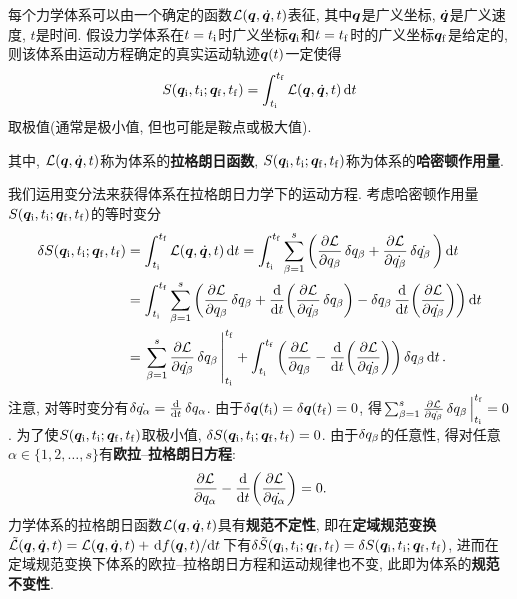 \begin{postulate}[最小作用量原理]\label{pos:最小作用量原理}
    每个力学体系可以由一个确定的函数$ \mathcal{L}(\vb*{q},\dot{\vb*{q}},t) $表征, 其中$ \vb*{q} $是广义坐标, $ \dot{\vb*{q}} $是广义速度, $ t $是时间. 假设力学体系在$ t=t_{\mathrm{i}} $时广义坐标$ \vb*{q}_{\mathrm{i}} $和$ t=t_{\mathrm{f}} $时的广义坐标$ \vb*{q}_{\mathrm{f}} $是给定的, 则该体系由运动方程确定的真实运动轨迹$ \vb*{q}(t) $一定使得
    \begin{equation}
        S(\vb*{q}_{\mathrm{i}},t_{\mathrm{i}};\vb*{q}_{\mathrm{f}},t_{\mathrm{f}})=\int_{t_{\mathrm{i}}}^{t_{\mathrm{f}}} \mathcal{L}(\vb*{q},\dot{\vb*{q}},t) \dd{t}
    \end{equation}
    取极值(通常是极小值, 但也可能是鞍点或极大值).
\end{postulate}
其中, $ \mathcal{L}(\vb*{q},\dot{\vb*{q}},t) $称为体系的\textbf{拉格朗日函数}, $ S(\vb*{q}_{\mathrm{i}},t_{\mathrm{i}};\vb*{q}_{\mathrm{f}},t_{\mathrm{f}}) $称为体系的\textbf{哈密顿作用量}.

我们运用变分法来获得体系在拉格朗日力学下的运动方程. 考虑哈密顿作用量$ S(\vb*{q}_{\mathrm{i}},t_{\mathrm{i}};\vb*{q}_{\mathrm{f}},t_{\mathrm{f}}) $的等时变分
\begin{align*}
    \var{\action(\vb*{q}_{\init},t_{\init};\vb*{q}_{\fini},t_{\fini})} &=\int_{t_{\init}}^{t_{\fini}} \lagr(\vb*{q},\dot{\vb*{q}},t) \dd{t} = \int_{t_{\init}}^{t_{\fini}} \sum_{\beta=1}^s\bigg(\pdv{\lagr}{q_{\beta}}\var{q_{\beta}}+\pdv{\lagr}{\dot{q_{\beta}}}\var{\dot{q_{\beta}}}\bigg) \dd{t}\\
    &=\int_{t_{\init}}^{t_{\fini}} \sum_{\beta=1}^s\bigg(\pdv{\lagr}{q_{\beta}}\var{q_{\beta}} + \dv{t}(\pdv{\lagr}{\dot{q_{\beta}}} \var{q_{\beta}}) - \var{q_{\beta}} \dv{t}(\pdv{\lagr}{\dot{q_{\beta}}})\bigg) \dd{t}\\
    &=\eval{\sum_{\beta=1}^s \pdv{\lagr}{\dot{q_{\beta}}}\var{q_{\beta}}}_{t_{\init}}^{t_{\fini}}+\int_{t_{\init}}^{t_{\fini}} \bigg(\pdv{\lagr}{q_{\beta}} - \dv{t}(\pdv{\lagr}{\dot{q_{\beta}}})\bigg) \var{q_{\beta}} \dd{t}.
\end{align*}
注意, 对等时变分有$ \var{\dot{q_{\alpha}}} = \dv{t} \var{q_{\alpha}} $. 由于$ \var{\vb*{q}(t_{\mathrm{i}})}=\var{\vb*{q}(t_{\mathrm{f}})}=0 $, 得$ \eval{\sum_{\beta=1}^s \pdv{\lagr}{\dot{q_{\beta}}}\var{q_{\beta}}}_{t_{\init}}^{t_{\fini}}=0 $. 为了使$ S(\vb*{q}_{\mathrm{i}},t_{\mathrm{i}};\vb*{q}_{\mathrm{f}},t_{\mathrm{f}}) $取极小值, $ \var{S(\vb*{q}_{\mathrm{i}},t_{\mathrm{i}};\vb*{q}_{\mathrm{f}},t_{\mathrm{f}})}=0 $. 由于$ \var{q_{\beta}} $的任意性, 得对任意$ \alpha \in \{1,2,\ldots,s\} $有\textbf{欧拉}--\textbf{拉格朗日方程}:
\begin{equation}
    \pdv{\mathcal{L}}{q_{\alpha}} - \dv{t}(\pdv{\mathcal{L}}{\dot{q_{\alpha}}}) = 0.
\end{equation}
力学体系的拉格朗日函数$ \mathcal{L}(\vb*{q},\dot{\vb*{q}},t) $具有\textbf{规范不定性}, 即在\textbf{定域规范变换}$ \tilde{\mathcal{L}}(\vb*{q},\dot{\vb*{q}},t)=\mathcal{L}(\vb*{q},\dot{\vb*{q}},t)+\dv*{f(\vb*{q},t)}{t} $下有$ \var{\tilde{S}(\vb*{q}_{\mathrm{i}},t_{\mathrm{i}};\vb*{q}_{\mathrm{f}},t_{\mathrm{f}})}=\var{S(\vb*{q}_{\mathrm{i}},t_{\mathrm{i}};\vb*{q}_{\mathrm{f}},t_{\mathrm{f}})} $, 进而在定域规范变换下体系的欧拉{--}拉格朗日方程和运动规律也不变, 此即为体系的\textbf{规范不变性}.

